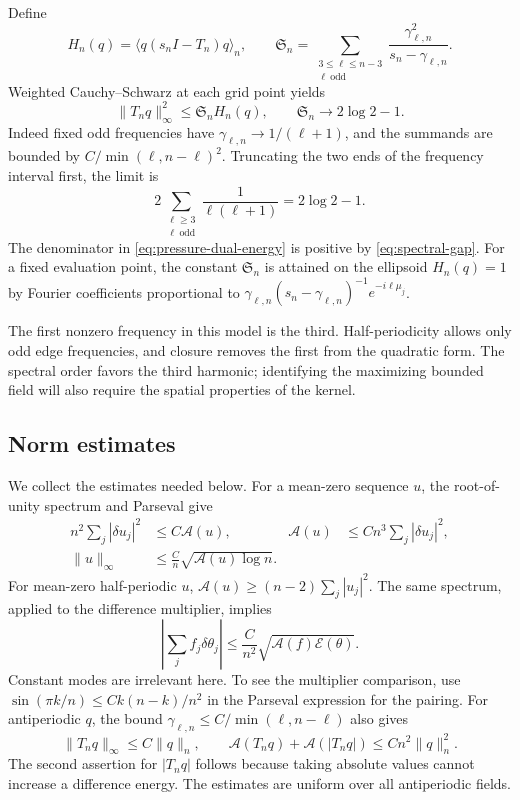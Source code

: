 \documentclass[11pt,reqno]{amsart}
\numberwithin{equation}{section}
\theoremstyle{definition}
\theoremstyle{remark}
\newcommand{\A}{\mathcal A}
\newcommand{\E}{\mathcal E}
\newcommand{\av}[1]{\langle #1\rangle_n}
\newcommand{\norm}[1]{\lVert #1\rVert}
\newcommand{\dd}{\delta}
\begin{document}
Define
\begin{equation}\label{eq:pressure-dual-energy}
 H_n(q)=\av{q(s_nI-T_n)q},\qquad
 \mathfrak S_n=\sum_{\substack{3\le\ell\le n-3\\\ell\ \mathrm{odd}}}
 \frac{\gamma_{\ell,n}^2}{s_n-\gamma_{\ell,n}}.
\end{equation}
Weighted Cauchy--Schwarz at each grid point yields
\begin{equation}\label{eq:dual-pressure}
 \norm{T_nq}_\infty^2\le\mathfrak S_n H_n(q),
 \qquad \mathfrak S_n\longrightarrow2\log2-1.
\end{equation}
Indeed fixed odd frequencies have $\gamma_{\ell,n}\to1/(\ell+1)$, and the summands are bounded by $C/\min(\ell,n-\ell)^2$. Truncating the two ends of the frequency interval first, the limit is
\[
 2\sum_{\substack{\ell\ge3\\\ell\ \mathrm{odd}}}\frac1{\ell(\ell+1)}=2\log2-1.
\]
The denominator in \eqref{eq:pressure-dual-energy} is positive by \eqref{eq:spectral-gap}. For a fixed evaluation point, the constant $\mathfrak S_n$ is attained on the ellipsoid $H_n(q)=1$ by Fourier coefficients proportional to $\gamma_{\ell,n}(s_n-\gamma_{\ell,n})^{-1}e^{-i\ell\mu_j}$.

The first nonzero frequency in this model is the third. Half-periodicity allows only odd edge frequencies, and closure removes the first from the quadratic form. The spectral order favors the third harmonic; identifying the maximizing bounded field will also require the spatial properties of the kernel.

\subsection{Norm estimates}\label{subsec:norms}
We collect the estimates needed below. For a mean-zero sequence $u$, the root-of-unity spectrum and Parseval give
\begin{align}
 n^2\sum_j|\dd u_j|^2&\le C\A(u),&
 \A(u)&\le Cn^3\sum_j|\dd u_j|^2,\label{eq:discrete-norms}\\
 \norm u_\infty&\le\frac Cn\sqrt{\A(u)\log n}.\label{eq:sup-energy}
\end{align}
For mean-zero half-periodic $u$, $\A(u)\ge(n-2)\sum_j|u_j|^2$. The same spectrum, applied to the difference multiplier, implies
\begin{equation}\label{eq:integration-parts}
 \left|\sum_j f_j\dd\theta_j\right|
 \le\frac C{n^2}\sqrt{\A(f)\E(\theta)}.
\end{equation}
Constant modes are irrelevant here. To see the multiplier comparison, use
$\sin(\pi k/n)\le Ck(n-k)/n^2$ in the Parseval expression for the pairing.
For antiperiodic $q$, the bound $\gamma_{\ell,n}\le C/\min(\ell,n-\ell)$ also gives
\begin{equation}\label{eq:field-smoothing}
 \norm{T_nq}_\infty\le C\norm q_n,
 \qquad \A(T_nq)+\A(|T_nq|)\le Cn^2\norm q_n^2.
\end{equation}
The second assertion for $|T_nq|$ follows because taking absolute values cannot increase a difference energy. The estimates are uniform over all antiperiodic fields.
\end{document}
